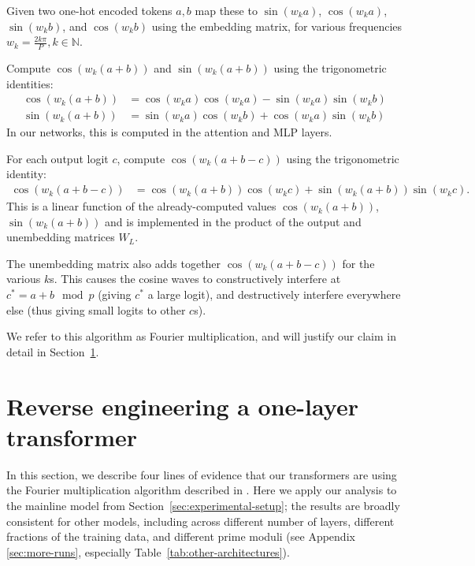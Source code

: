 \documentclass{article} %
\newcommand{\tkpp}{\frac{2k\pi}{P}}
\newcommand{\cosp}[1]{\cos \left ( #1 \right )}
\newcommand{\sinp}[1]{\sin \left ( #1 \right )}
\begin{document}
\begin{compactitem} 
    \item  Given two one-hot encoded tokens $a, b$  map these to $\sin({w_k a})$, $ \cos(w_k a)$, $\sin(w_k b)$, and $ \cos({w_k b})$ using the embedding matrix, for various frequencies $w_k = \tkpp, k \in \mathbb{N}$. %
    \item Compute $\cos\left (w_k (a+b) \right )$ and $\sin \left (w_k (a+b) \right )$ using the trigonometric identities:
    \begin{align*}
        \cosp{w_k (a+b)} &= \cosp{w_k a}\cosp{w_k  a} - \sinp{w_k a}\sinp{w_k b}\\
        \sinp{w_k (a+b)} &= \sin(w_k a)\cosp{w_k b} + \cosp{w_k a} \sinp{w_k b}
    \end{align*}   
In our networks, this is computed in the attention and MLP layers. %
    \item For each output logit $c$, compute $\cosp{w_k (a+b-c)}$ using the trigonometric identity:
        \begin{align}\label{eq:cos-sub}
            \cosp{w_k (a+b-c)} &= \cosp{w_k (a+b)}\cosp{w_k c} + \sinp{w_k(a+b)}\sinp{w_k c}.
        \end{align}
    This is a linear function of the already-computed values $\cos(w_k(a+b))$, $\sin(w_k(a+b))$ and is implemented in the product of the output and unembedding matrices $W_L$. %
    \item The unembedding matrix also adds together $\cosp{w_k ({a+b-c})}$ for the various $k$s. This causes the cosine waves to constructively interfere at $c^* =a+b\mod p$ (giving $c^*$ a large logit), and destructively interfere everywhere else (thus giving small logits to other $c$s). 
\end{compactitem}
We refer to this algorithm as Fourier multiplication, and will justify our claim in detail in Section~\ref{sec:analysis}.

\section{Reverse engineering a one-layer transformer}
\label{sec:analysis}
In this section, we describe four lines of evidence that our transformers are using the Fourier multiplication algorithm described in . Here we apply our analysis to the mainline model from Section~\ref{sec:experimental-setup}; the results are broadly consistent for other models, including across different number of layers, different fractions of the training data, and different prime moduli (see Appendix \ref{sec:more-runs}, especially Table~\ref{tab:other-architectures}).
\end{document}
